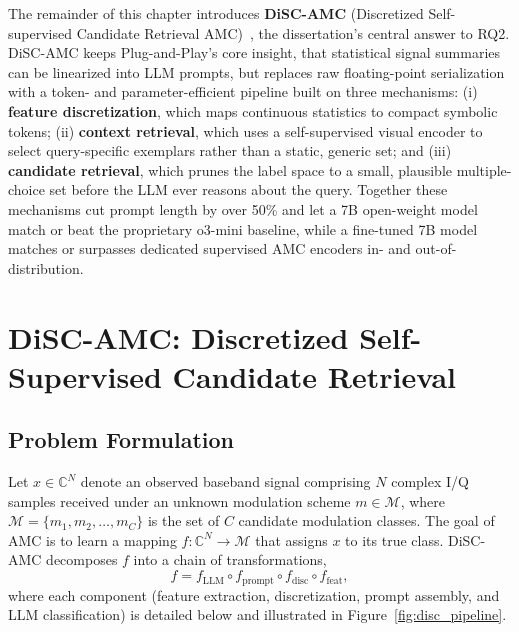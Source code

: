 The remainder of this chapter introduces \textbf{DiSC-AMC} (Discretized Self-supervised Candidate Retrieval AMC)~\cite{disc_amc}, the dissertation's central answer to RQ2. DiSC-AMC keeps Plug-and-Play's core insight, that statistical signal summaries can be linearized into LLM prompts, but replaces raw floating-point serialization with a token- and parameter-efficient pipeline built on three mechanisms: (i) \textbf{feature discretization}, which maps continuous statistics to compact symbolic tokens; (ii) \textbf{context retrieval}, which uses a self-supervised visual encoder to select query-specific exemplars rather than a static, generic set; and (iii) \textbf{candidate retrieval}, which prunes the label space to a small, plausible multiple-choice set before the LLM ever reasons about the query. Together these mechanisms cut prompt length by over 50\% and let a 7B open-weight model match or beat the proprietary o3-mini baseline, while a fine-tuned 7B model matches or surpasses dedicated supervised AMC encoders in- and out-of-distribution.

\section{DiSC-AMC: Discretized Self-Supervised Candidate Retrieval}
\label{sec:disc_amc}

\subsection{Problem Formulation}

Let $x \in \mathbb{C}^N$ denote an observed baseband signal comprising $N$ complex I/Q samples received under an unknown modulation scheme $m \in \mathcal{M}$, where $\mathcal{M} = \{m_1, m_2, \dots, m_C\}$ is the set of $C$ candidate modulation classes. The goal of AMC is to learn a mapping $f: \mathbb{C}^N \to \mathcal{M}$ that assigns $x$ to its true class. DiSC-AMC decomposes $f$ into a chain of transformations,
\begin{equation}
    f = f_{\mathrm{LLM}} \circ f_{\mathrm{prompt}} \circ f_{\mathrm{disc}} \circ f_{\mathrm{feat}},
\end{equation}
where each component (feature extraction, discretization, prompt assembly, and LLM classification) is detailed below and illustrated in Figure~\ref{fig:disc_pipeline}.


